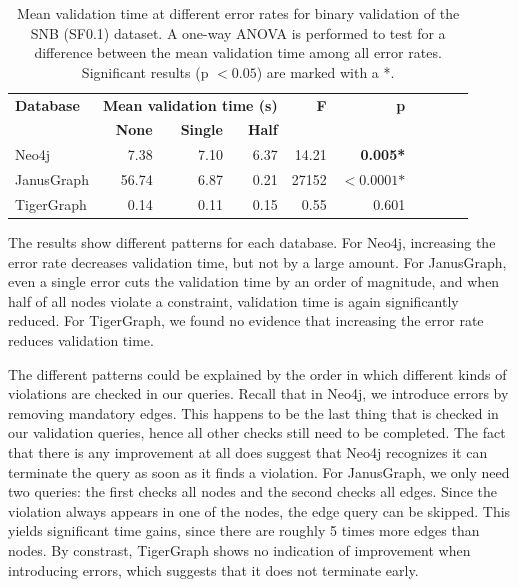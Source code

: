 \documentclass{report}
\theoremstyle{definition}
\begin{document}
\begin{table}[t]
  \centering
  \begin{tabular}{lrrrrrrrrr}
    \hline
    \textbf{Database} & \multicolumn{3}{c}{\textbf{Mean validation time (s)}} & \textbf{F}      & \textbf{p}                                           \\
                      & \textbf{None}                                         & \textbf{Single} & \textbf{Half} &                                      \\
    \hline
    Neo4j             & 7.38                                                  & 7.10            & 6.37          & 14.21 & \textbf{0.005*}              \\
    JanusGraph        & 56.74                                                 & 6.87            & 0.21          & 27152 & $\mathbf{<0.0001}\textbf{*}$ \\
    TigerGraph        & 0.14                                                  & 0.11            & 0.15          & 0.55  & 0.601                        \\
    \hline
  \end{tabular}
  \caption[Mean validation time at different error rates]{Mean validation time at different error rates for binary validation of the SNB (SF0.1) dataset. A one-way ANOVA is performed to test for a difference between the mean validation time among all error rates. Significant results (p $< 0.05$) are marked with a *.}
  \label{tab:results-errors}
\end{table}

The results show different patterns for each database. For Neo4j, increasing the error rate decreases validation time, but not by a large amount. For JanusGraph, even a single error cuts the validation time by an order of magnitude, and when half of all nodes violate a constraint, validation time is again significantly reduced. For TigerGraph, we found no evidence that increasing the error rate reduces validation time.

The different patterns could be explained by the order in which different kinds of violations are checked in our queries. Recall that in Neo4j, we introduce errors by removing mandatory edges. This happens to be the last thing that is checked in our validation queries, hence all other checks still need to be completed. The fact that there is any improvement at all does suggest that Neo4j recognizes it can terminate the query as soon as it finds a violation. For JanusGraph, we only need two queries: the first checks all nodes and the second checks all edges. Since the violation always appears in one of the nodes, the edge query can be skipped. This yields significant time gains, since there are roughly 5 times more edges than nodes. By constrast, TigerGraph shows no indication of improvement when introducing errors, which suggests that it does not terminate early.
\end{document}
